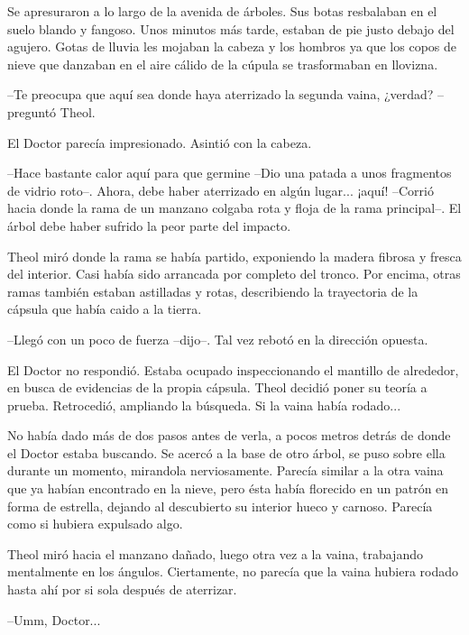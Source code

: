 Se apresuraron a lo largo de la avenida de árboles. Sus botas resbalaban en el suelo blando y fangoso. Unos minutos más tarde, estaban de pie justo debajo del agujero. Gotas de lluvia les mojaban la cabeza y los hombros ya que los copos de nieve que danzaban en el aire cálido de la cúpula se trasformaban en llovizna.



--Te preocupa que aquí sea donde haya aterrizado la segunda vaina, ¿verdad? --preguntó Theol.



El Doctor parecía impresionado. Asintió con la cabeza.

--Hace bastante calor aquí para que germine --Dio una patada a unos fragmentos de vidrio roto--. Ahora, debe haber aterrizado en algún lugar... ¡aquí! --Corrió hacia donde la rama de un manzano colgaba rota y floja de la rama principal--. El árbol debe haber sufrido la peor parte del impacto.



Theol miró donde la rama se había partido, exponiendo la madera fibrosa y fresca del interior. Casi había sido arrancada por completo del tronco. Por encima, otras ramas también estaban astilladas y rotas, describiendo la trayectoria de la cápsula que había caido a la tierra.

--Llegó con un poco de fuerza --dijo--. Tal vez rebotó en la dirección opuesta.



El Doctor no respondió. Estaba ocupado inspeccionando el mantillo de alrededor, en busca de evidencias de la propia cápsula. Theol decidió poner su teoría a prueba. Retrocedió, ampliando la búsqueda. Si la vaina había rodado...



No había dado más de dos pasos antes de verla, a pocos metros detrás de donde el Doctor estaba buscando. Se acercó a la base de otro árbol, se puso sobre ella durante un momento, mirandola nerviosamente. Parecía similar a la otra vaina que ya habían encontrado en la nieve, pero ésta había florecido en un patrón en forma de estrella, dejando al descubierto su interior hueco y carnoso. Parecía como si hubiera expulsado algo.



Theol miró hacia el manzano dañado, luego otra vez a la vaina, trabajando mentalmente en los ángulos. Ciertamente, no parecía que la vaina hubiera rodado hasta ahí por si sola después de aterrizar.

--Umm, Doctor...



